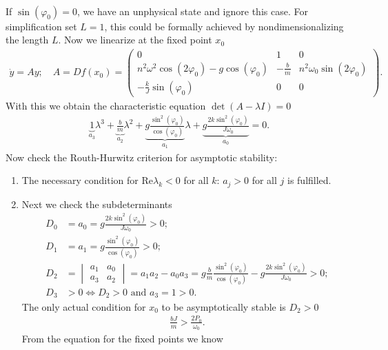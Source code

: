\begin{ex}
\begin{align}
\end{align}
If $\sin(\varphi_0)=0$, we have an unphysical state and ignore this case. For simplification set $L=1$, this could be formally achieved by nondimensionalizing the length $L$. Now we linearize at the fixed point $x_0$ 
\begin{align}
	\dot{y} = Ay; \quad A = Df(x_0) =
	\begin{pmatrix}
		0 & 1 & 0 \\
		n^2 \omega^2 \cos(2\varphi_0) -g\cos(\varphi_0) & -\frac{b}{m} & n^2 \omega _0 \sin(2\varphi_0) \\
		-\frac{k}{J}\sin(\varphi_0) & 0 & 0
	\end{pmatrix}
.	
\end{align}
With this we obtain the characteristic equation $\det(A - \lambda I )= 0$ 
\begin{align}
	\underbrace{1}_{a_3} \lambda^3 + \underbrace{\frac{b}{m}}_{a_2}\lambda ^2 + \underbrace{ {g}\frac{\sin^2(\varphi_0)}{\cos(\varphi_0)}}_{a_1} \lambda + \underbrace{ {g} \frac{2k \sin^2 (\varphi_0)}{J \omega_0}}_{a_0} = 0.
\end{align}
Now check the Routh-Hurwitz criterion for asymptotic stability:
\begin{enumerate}
	\item The necessary condition for $ \textrm{Re} \lambda _k<0$ for all $k$: $a_j> 0$ for all $ j$ is fulfilled.
	\item Next we check the subdeterminants
		\begin{subequations}
\begin{align}
	D_0 &= a_0 = {g} \frac{2k \sin^2 (\varphi_0)}{J \omega_0}>0;\quad \\ 
	D_1 &= a_1 = {g}\frac{\sin^2 (\varphi_0)}{\cos(\varphi_0)} >0; \\
	D_2 &= 
	\begin{vmatrix}
		a_1 & a_0 \\
		a_3 & a_2
	\end{vmatrix}
	= a_1a_2 - a_0a_3 = g\frac{b}{m}\frac{\sin^2(\varphi_0)}{\cos(\varphi_0)} - g\frac{2k \sin^2(\varphi_0)}{J \omega_0} >0;\\
	D_3 &> 0 \iff D_2 >0  \textrm{ and } a_3=1>0.
\end{align}
		\end{subequations}
The only actual condition for $x_0$ to be asymptotically stable is $D_2 >0$ 
\begin{align}
	\frac{bJ}{m} > \frac{2 P_0}{\omega_0}.
\end{align}
From the equation for the fixed points we know 

\end{enumerate}
\end{ex}
